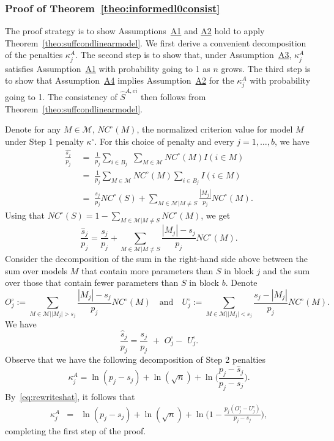 \documentclass[
  12pt]{article}
\newcommand{\M}{\mathcal{M}}
\begin{document}
\subsubsection{Proof of Theorem~\ref{theo:informedl0consist}} The proof strategy is to show Assumptions~\hyperlink{lab:A1}{A1} and \hyperlink{lab:A2}{A2} hold to apply Theorem~\ref{theo:suffcondlinearmodel}. We first derive a convenient decomposition of the penalties $\kappa^A_j$. The second step is to show that, under Assumption~\hyperlink{lab:A3}{A3}, $\kappa^{A}_j$ satisfies Assumption~\hyperlink{lab:A1}{A1} with probability going to 1 as $n$ grows. The third step is to show that Assumption~\hyperlink{lab:A4}{A4} implies Assumption~\hyperlink{lab:A2}{A2} for the $\kappa^{A}_j$ with probability going to 1. The consistency of $\hat S^{A,ei}$ then follows from Theorem~\ref{theo:suffcondlinearmodel}.

Denote for any $M\in\M$, $NC^{\circ}(M)$, the normalized criterion value for model $M$ under Step 1 penalty $\kappa^{\circ}$. For this choice of penalty and every $j=1,\ldots,b$, we have
\begin{align*}
    \frac{\widehat{s_j}}{p_j}
    &\;=\; \frac{1}{p_j}\sum_{i\in B_j}\,\,\sum_{M\in \M}NC^{\circ}(M)I(i\in M)\\
   &\;=\; \frac{1}{p_j}\sum_{M \in \M}NC^{\circ}(M)\sum_{i \in B_j}I(i\in M) \\
   &\;=\;\frac{s_j}{p_j}NC^{\circ}(S) + \sum_{M \in \M | M \neq S}\frac{|M_j|}{p_j}NC^{\circ}(M).
\end{align*}
Using that $NC^{\circ}(S)=1-\sum_{M \in \M | M \neq S}NC^{\circ}(M)$, we get
\begin{equation*}
   \frac{\hat{s}_j}{p_j}
   =\frac{s_j}{p_j} + \sum_{M \in \M | M \neq S}\frac{|M_j|-s_j}{p_j}NC^{\circ}(M).
\end{equation*}
Consider the decomposition of the sum in the right-hand side above between the sum over models $M$ that contain more parameters than $S$ in block $j$ and the sum over those that contain fewer parameters than $S$ in block $b$. Denote
$$
    O_j^{\circ} := \sum_{M \in \M | |M_j| > s_j}\frac{|M_j|-s_j}{p_j}NC^{\circ}(M)\quad\text{and}\quad
    U_j^{\circ} := \sum_{M \in \M | |M_j| < s_j}\frac{s_j-|M_j|}{p_j}NC^{\circ}(M).
$$
We have
\begin{equation}\label{eq:rewriteshat}
  \frac{\hat{s}_j}{p_j}  = \frac{s_j}{p_j}\,\,+\,\, O_j^{\circ}-\,\,U_j^{\circ}.
\end{equation}
Observe that we have the following decomposition of Step 2 penalties
$$\kappa^{A}_j
    = \ln(p_j-s_j) + \ln(\sqrt{n}) + \ln\Big(\frac{p_j-\hat{s}_j}{p_j-s_j}\Big). \nonumber$$
By~\eqref{eq:rewriteshat}, it follows that
\begin{eqnarray}\label{eq:decompstep2pen}
    \kappa^{A}_j&=& \ln(p_j-s_j)+\ln(\sqrt{n})+\ln\Big(1-\frac{p_j(O^{\circ}_j-U^{\circ}_j)}{p_j-s_j}\Big),
\end{eqnarray}
completing the first step of the proof.
\end{document}
